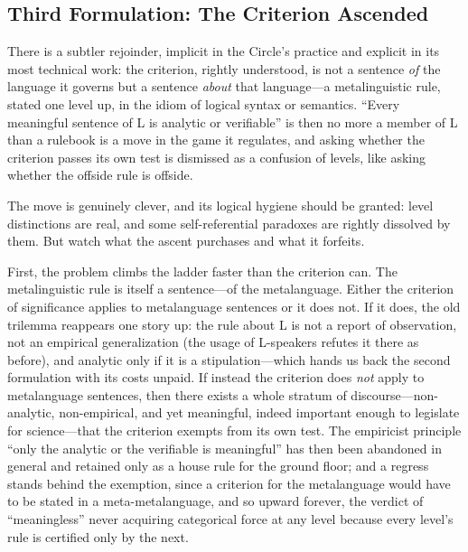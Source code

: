 \subsection{Third Formulation: The Criterion Ascended}

There is a subtler rejoinder, implicit in the Circle's practice and explicit in its most technical work: the criterion, rightly understood, is not a sentence \emph{of} the language it governs but a sentence \emph{about} that language---a metalinguistic rule, stated one level up, in the idiom of logical syntax or semantics. ``Every meaningful sentence of L is analytic or verifiable'' is then no more a member of L than a rulebook is a move in the game it regulates, and asking whether the criterion passes its own test is dismissed as a confusion of levels, like asking whether the offside rule is offside.

The move is genuinely clever, and its logical hygiene should be granted: level distinctions are real, and some self-referential paradoxes are rightly dissolved by them. But watch what the ascent purchases and what it forfeits.

First, the problem climbs the ladder faster than the criterion can. The metalinguistic rule is itself a sentence---of the metalanguage. Either the criterion of significance applies to metalanguage sentences or it does not. If it does, the old trilemma reappears one story up: the rule about L is not a report of observation, not an empirical generalization (the usage of L-speakers refutes it there as before), and analytic only if it is a stipulation---which hands us back the second formulation with its costs unpaid. If instead the criterion does \emph{not} apply to metalanguage sentences, then there exists a whole stratum of discourse---non-analytic, non-empirical, and yet meaningful, indeed important enough to legislate for science---that the criterion exempts from its own test. The empiricist principle ``only the analytic or the verifiable is meaningful'' has then been abandoned in general and retained only as a house rule for the ground floor; and a regress stands behind the exemption, since a criterion for the metalanguage would have to be stated in a meta-metalanguage, and so upward forever, the verdict of ``meaningless'' never acquiring categorical force at any level because every level's rule is certified only by the next.

